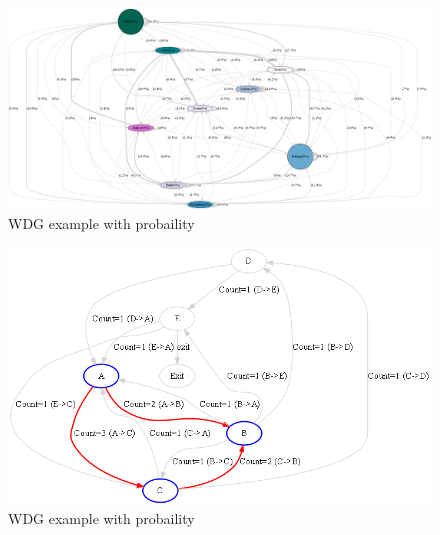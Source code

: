 \begin{enumerate}
\begin{enumerate}
\begin{figure}
  \centering
  \includegraphics[scale=.20]{Graphics/log_with_color.png}
  \caption{WDG example with probaility}\label{fig:log_with_color}
\end{figure}

\begin{figure}
  \centering
  \includegraphics[scale=.58]{Graphics/sample_log.png}
  \caption{WDG example with probaility}\label{fig:sample_log}
\end{figure}

                \end{enumerate}
	\end{enumerate}

